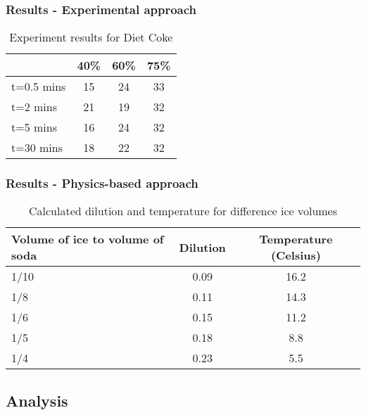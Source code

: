 \documentclass[compress,handout,10pt]{beamer}
\begin{document}
\begin{frame}
    \frametitle{Results - Experimental approach}
\begin{table}[ h]
\centering
\begin{tabular}{ l || c|c|c}
  &40\% &60\% & 75\%  \\
\hline  
t=0.5 mins & 15 & 24 & 33\\ 
\hline  
t=2 mins & 21& 19 & 32\\ 
\hline  
t=5 mins & 16 & 24 & 32\\ 
\hline  
t=30 mins & 18 & 22& 32\\ 
\hline  
   
 \end{tabular}

\caption{Experiment results for Diet Coke}

\end{table}
\end{frame}

\begin{frame}
    \frametitle{Results - Physics-based approach}
\begin{table}[ h]
\centering
\begin{tabular}{ l || c|c}
 Volume of ice to volume of soda &Dilution &Temperature (Celsius) \\
\hline  
1/10 & 0.09&16.2\\ 
\hline  
1/8 & 0.11&14.3\\ 
\hline 
1/6 & 0.15&11.2\\ 
\hline 
1/5 & 0.18&8.8\\ 
\hline 
1/4 & 0.23&5.5\\ 
\hline 
   
 \end{tabular}

\caption{Calculated dilution and temperature for difference ice volumes}

\end{table}
\end{frame}
 
\subsection{Analysis}
\end{document}
